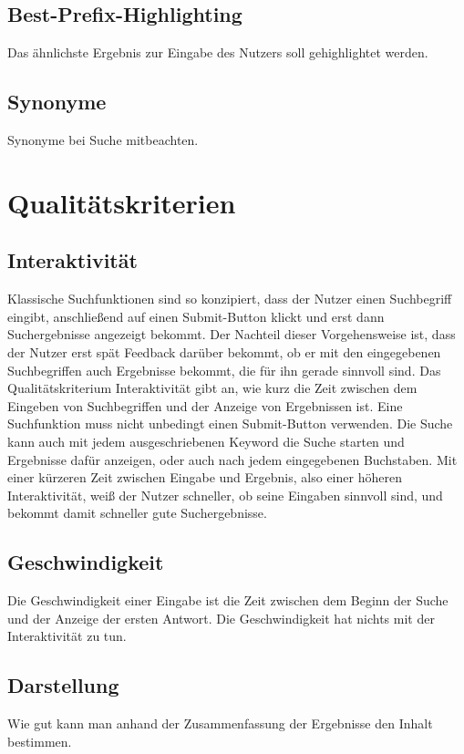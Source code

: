 \subsection*{Best-Prefix-Highlighting}
Das ähnlichste Ergebnis zur Eingabe des Nutzers soll gehighlightet werden.

\subsection*{Synonyme}
Synonyme bei Suche mitbeachten.

\section{Qualitätskriterien}

\subsection*{Interaktivität}
Klassische Suchfunktionen sind so konzipiert, dass der Nutzer einen Suchbegriff eingibt, anschließend auf einen Submit-Button klickt und erst dann Suchergebnisse angezeigt bekommt. Der Nachteil dieser Vorgehensweise ist, dass der Nutzer erst spät Feedback darüber bekommt, ob er mit den eingegebenen Suchbegriffen auch Ergebnisse bekommt, die für ihn gerade sinnvoll sind. Das Qualitätskriterium Interaktivität gibt an, wie kurz die Zeit zwischen dem Eingeben von Suchbegriffen und der Anzeige von Ergebnissen ist. Eine Suchfunktion muss nicht unbedingt einen Submit-Button verwenden. Die Suche kann auch mit jedem ausgeschriebenen Keyword die Suche starten und Ergebnisse dafür anzeigen, oder auch nach jedem eingegebenen Buchstaben. Mit einer kürzeren Zeit zwischen Eingabe und Ergebnis, also einer höheren Interaktivität, weiß der Nutzer schneller, ob seine Eingaben sinnvoll sind, und bekommt damit schneller gute Suchergebnisse.

\subsection*{Geschwindigkeit}
Die Geschwindigkeit einer Eingabe ist die Zeit zwischen dem Beginn der Suche und der Anzeige der ersten Antwort. Die Geschwindigkeit hat nichts mit der Interaktivität zu tun. 

\subsection*{Darstellung}
Wie gut kann man anhand der Zusammenfassung der Ergebnisse den Inhalt bestimmen.


